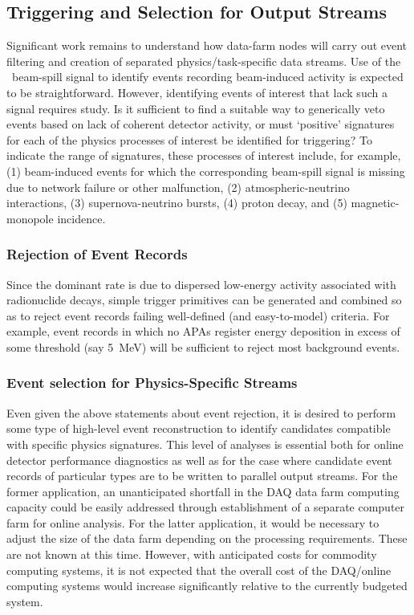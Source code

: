 \subsection{Triggering and Selection for Output Streams}

Significant work remains to understand how data-farm nodes will carry out 
event filtering and creation of separated physics/task-specific data 
streams.  
Use of the \LBNE\ beam-spill signal to identify events recording 
beam-induced activity is expected to be straightforward.  However, 
identifying events of interest that lack such a signal requires study.  
Is it sufficient to find a suitable way to generically veto events based 
on lack of coherent detector activity, or must `positive' signatures for 
each of the physics processes of interest be identified for triggering?  
To indicate the range of signatures, 
these processes of interest include, for example, (1) beam-induced events 
for which the corresponding beam-spill signal is missing due to 
network failure or other malfunction, (2) atmospheric-neutrino interactions, 
(3) supernova-neutrino bursts, (4) proton decay, and (5) magnetic-monopole 
incidence.  

\subsubsection{Rejection of Event Records}

Since the dominant rate is due to dispersed low-energy activity 
associated with radionuclide decays, simple trigger primitives can be 
generated and combined so as to reject event records failing well-defined 
(and easy-to-model) criteria.  
For example, event records in which no APAs 
register energy deposition in excess of some threshold (say 5~MeV) 
will be sufficient to reject most background events.

\subsubsection{Event selection for Physics-Specific Streams}

Even given the above statements about event rejection, it is desired to 
perform some type of high-level event reconstruction to identify candidates 
compatible with specific physics signatures.  This level of analyses is 
essential both for online detector performance diagnostics as well as 
for the case where candidate event records of particular types are to be 
written to parallel output streams.  For the former application, 
an unanticipated shortfall in the DAQ data farm computing capacity 
could be easily addressed through establishment of a separate computer farm 
for online analysis.
For the latter application, it would be necessary to adjust the size of 
the data farm depending on the processing requirements.  These are not 
known at this time.  However, with anticipated costs for commodity 
computing systems, it is not expected that the overall cost of the 
DAQ/online computing systems would increase significantly relative to 
the currently budgeted system.

